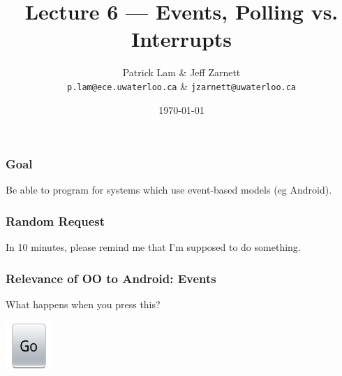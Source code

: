 

\usepackage{alltt}

\title{Lecture 6 --- Events, Polling vs. Interrupts}

\author{Patrick Lam \& Jeff Zarnett \\ \small \texttt{p.lam@ece.uwaterloo.ca} \& \texttt{jzarnett@uwaterloo.ca}}
\date{\today}





\begin{frame}
  \titlepage

\end{frame}

\begin{frame}
\frametitle{Goal}

\Large

\begin{changemargin}{2.5cm}
Be able to program for systems which use event-based models (eg Android).
\end{changemargin}

\end{frame}


\begin{frame}
\frametitle{Random Request}

\begin{changemargin}{2.5cm}
In 10 minutes, please remind me that I'm supposed to do something.
\end{changemargin}

\end{frame}

\begin{frame}
\frametitle{Relevance of OO to Android: Events}

\begin{changemargin}{1.5cm}
What happens when you press this?

\begin{center}
\includegraphics{images/go-button}
\end{center}
\large {}
\end{changemargin}

\end{frame}

